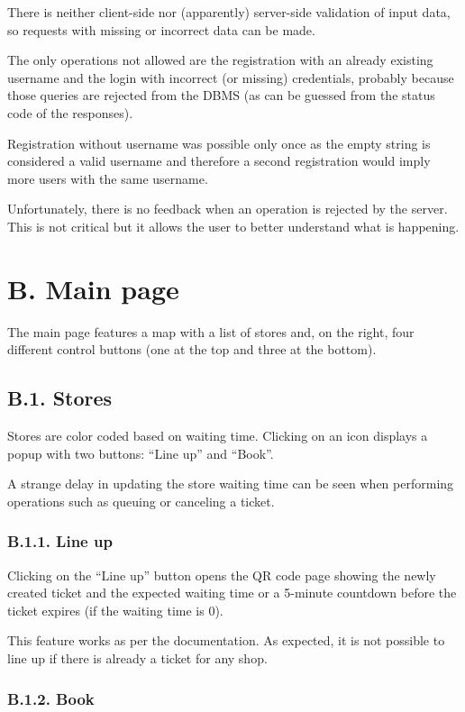 There is neither client-side nor (apparently) server-side validation of input data, so requests with missing or incorrect data can be made.

The only operations not allowed are the registration with an already existing username and the login with incorrect (or missing) credentials, probably because those queries are rejected from the DBMS (as can be guessed from the status code of the responses).

Registration without username was possible only once as the empty string is considered a valid username and therefore a second registration would imply more users with the same username.

Unfortunately, there is no feedback when an operation is rejected by the server. This is not critical but it allows the user to better understand what is happening.

\section{B. Main page}

The main page features a map with a list of stores and, on the right, four different control buttons (one at the top and three at the bottom).

\subsection{B.1. Stores}

Stores are color coded based on waiting time. Clicking on an icon displays a popup with two buttons: ``Line up'' and ``Book''.

A strange delay in updating the store waiting time can be seen when performing operations such as queuing or canceling a ticket.

\subsubsection{B.1.1. Line up}

Clicking on the ``Line up'' button opens the QR code page showing the newly created ticket and the expected waiting time or a 5-minute countdown before the ticket expires (if the waiting time is 0).

This feature works as per the documentation.
As expected, it is not possible to line up if there is already a ticket for any shop.

\subsubsection{B.1.2. Book}

